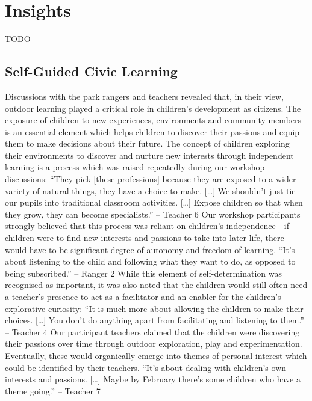 \section{Insights}

TODO

\subsection{Self-Guided Civic Learning}

Discussions with the park rangers and teachers revealed that, in their view, outdoor learning played a critical role in children’s development as citizens. The exposure of children to new experiences, environments and community members is an essential element which helps children to discover their passions and equip them to make decisions about their future. The concept of children exploring their environments to discover and nurture new interests through independent learning is a process which was raised repeatedly during our workshop discussions:
“They pick [these professions] because they are exposed to a wider variety of natural things, they have a choice to make. […] We shouldn’t just tie our pupils into traditional classroom activities. […] Expose children so that when they grow, they can become specialists.” – Teacher 6
Our workshop participants strongly believed that this process was reliant on children’s independence—if children were to find new interests and passions to take into later life, there would have to be significant degree of autonomy and freedom of learning. 
“It’s about listening to the child and following what they want to do, as opposed to being subscribed.” – Ranger 2
While this element of self-determination was recognised as important, it was also noted that the children would still often need a teacher’s presence to act as a facilitator and an enabler for the children’s explorative curiosity:
“It is much more about allowing the children to make their choices. […] You don’t do anything apart from facilitating and listening to them.” – Teacher 4
Our participant teachers claimed that the children were discovering their passions over time through outdoor exploration, play and experimentation. Eventually, these would organically emerge into themes of personal interest which could be identified by their teachers.
“It’s about dealing with children’s own interests and passions. […] Maybe by February there’s some children who have a theme going.” – Teacher 7
